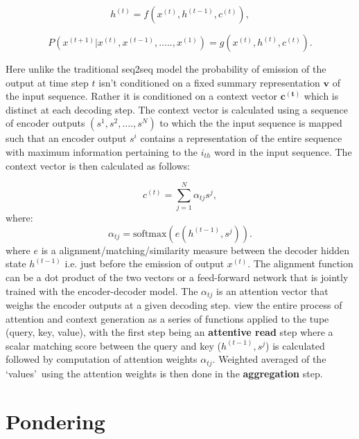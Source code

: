 \begin{equation}\label{attn:eqn1}
h^{(t)} = f(x^{(t)}, h^{(t-1)}, c^{(t)}),
\end{equation}

\begin{equation} \label{attn:eqn2}
P(x^{(t+1)}|x^{(t)}, x^{(t-1)},.....,x^{(1)}) = g(x^{(t)}, h^{(t)}, c^{(t)}).
\end{equation}

Here unlike the traditional seq2seq model the probability of emission of the output at time step $t$ isn't conditioned on a fixed summary representation $\mathbf{v}$ of the input sequence. Rather it is conditioned on a context vector $\mathbf{c^{(t)}}$ which is distinct at each decoding step. The context vector is calculated using a sequence of encoder outputs $(s^1, s^2, ....,s^N)$ to which the the input sequence is mapped such that an encoder output $s^i$ contains a representation of the entire sequence with maximum information pertaining to the $i_{th}$ word in the input sequence. The context vector is then calculated as follows:

\begin{equation}\label{attn:eqn3}
	c^{(t)}  = \sum_{j=1}^N \alpha_{tj} s^j,
\end{equation}
where:
\begin{equation}\label{attn:eqn4}
	\alpha_{tj} = \text{softmax}(e(h^{(t-1)}, s^j)).
\end{equation}
where $e$ is a alignment/matching/similarity measure between the decoder hidden state $h^{(t-1)}$ i.e. just before the emission of output $x^{(t)}$. The alignment function can be a dot product of the two vectors or a feed-forward network that is jointly trained with the encoder-decoder model. The $\alpha_{tj}$ is an attention vector that weighs the encoder outputs at a given decoding step. \cite{Vaswani2017} view the entire process of attention and context generation as a series of functions applied to the tupe (query, key, value), with the first step being an \textbf{attentive read} step where a scalar matching score between the query and key ($h^{(t-1)}, s^j$) is calculated followed by computation of attention weights $\alpha_{tj}$. Weighted averaged of the \lq values{}\rq\ using the attention weights is then done in the \textbf{aggregation} step.  


\section{Pondering}

